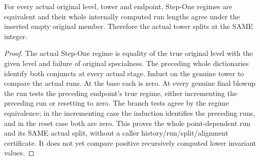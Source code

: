 \begin{theorem}
\label{hir:step-one-empty-insertion-run}
\leanok
For every actual original level, tower and endpoint, Step-One regimes are equivalent and their whole internally computed run lengths agree under the inserted empty original member. Therefore the actual tower splits at the SAME integer.
\end{theorem}
\begin{proof}
The actual Step-One regime is equality of the true original level with the given level and failure of original specialness. The preceding whole dictionaries identify both conjuncts at every actual stage. Induct on the genuine tower to compare the actual runs. At the base each is zero. At every genuine final blowup the run tests the preceding endpoint's true regime, either incrementing the preceding run or resetting to zero. The branch tests agree by the regime equivalence; in the incrementing case the induction identifies the preceding runs, and in the reset case both are zero. This proves the whole point-dependent run and its SAME actual split, without a caller history/run/split/alignment certificate. It does not yet compare positive recursively computed lower invariant values.
\end{proof}


